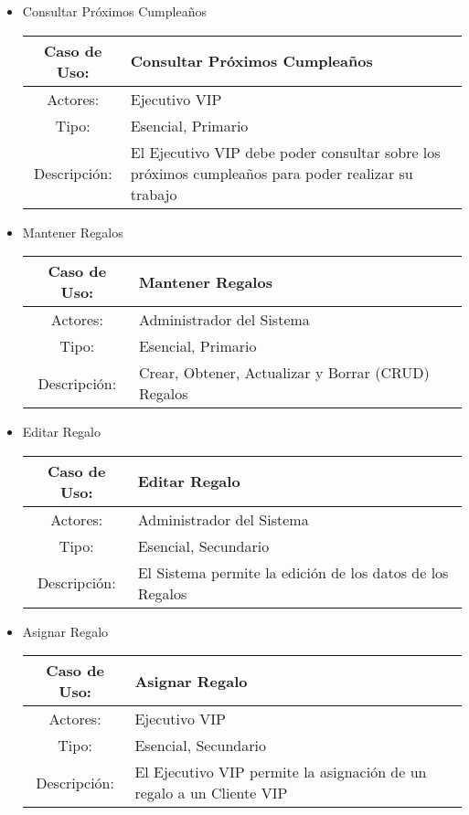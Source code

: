 \begin{itemize}
	\item Consultar Próximos Cumpleaños\\
		\begin{tabular}{|c|p{11cm}|}\hline
			Caso de Uso: & Consultar Próximos Cumpleaños\\\hline
			Actores: &Ejecutivo VIP\\\hline
			Tipo: & Esencial, Primario\\\hline
			Descripción: &El Ejecutivo VIP debe poder consultar sobre los próximos cumpleaños para poder realizar su trabajo\\\hline
		\end{tabular}

	\item Mantener Regalos\\
		\begin{tabular}{|c|p{11cm}|}\hline
			Caso de Uso: & Mantener Regalos\\\hline
			Actores: & Administrador del Sistema\\\hline
			Tipo: & Esencial, Primario\\\hline
			Descripción: & Crear, Obtener, Actualizar y Borrar (CRUD) Regalos\\\hline
		\end{tabular}

	\item Editar Regalo\\
		\begin{tabular}{|c|p{11cm}|}\hline
			Caso de Uso: & Editar Regalo \\\hline
			Actores: & Administrador del Sistema\\\hline
			Tipo: & Esencial, Secundario\\\hline
			Descripción: &El Sistema permite la edición de los datos de los Regalos\\\hline
		\end{tabular}

	\item Asignar Regalo\\
		\begin{tabular}{|c|p{11cm}|}\hline
			Caso de Uso: & Asignar Regalo\\\hline
			Actores: &Ejecutivo VIP\\\hline
			Tipo: & Esencial, Secundario\\\hline
			Descripción: &El Ejecutivo VIP permite la asignación de un regalo a un Cliente VIP\\\hline
		\end{tabular}


\end{itemize}
